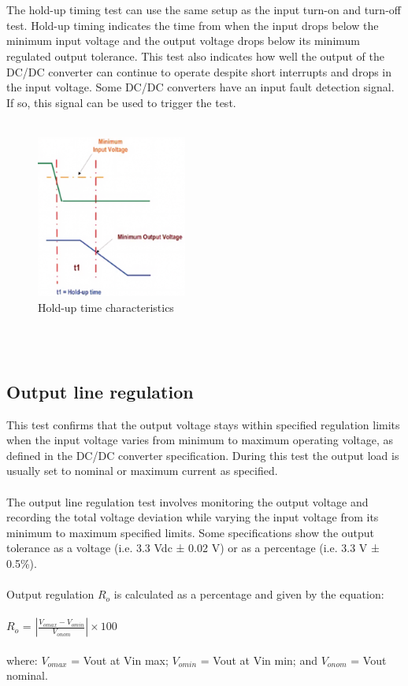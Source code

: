 \\ \\	
The hold-up timing test can use the same setup as the input turn-on and turn-off test. Hold-up timing indicates the time from when the input drops below the minimum input voltage and the output voltage drops below its minimum regulated output tolerance. This test also indicates how well the output of the DC/DC converter can continue to operate despite short interrupts and drops in the input voltage. Some DC/DC converters have an input fault detection signal. If so, this signal can be used to trigger the test.
\\ \\
\begin{figure}[h]
	\centering
	\includegraphics[width=140pt]{IMGS/HoldUpTimeTest.jpg}
	\caption{Hold-up time characteristics}
	\label{fig:arch}
\end{figure} 
\\ \\
\subsection{Output line regulation}

This test confirms that the output voltage stays within specified regulation limits when the input voltage varies from minimum to maximum operating voltage, as defined in the DC/DC converter specification. During this test the output load is usually set to nominal or maximum current as specified.
\\ \\
The output line regulation test involves monitoring the output voltage and recording the total voltage deviation while varying the input voltage from its minimum to maximum specified limits. Some specifications show the output tolerance as a voltage (i.e. 3.3 Vdc ± 0.02 V) or as a percentage (i.e. 3.3 V ± 0.5\%).
\\ \\
Output regulation $R_{o}$ is calculated as a percentage and given by the equation:
\\ \\
\hspace*{5cm}$R_{o}$ = $\left | \frac{V_{omax}-V_{omin}}{V_{onom}} \right | \times 100$
\\ \\
where:
$V_{omax}$ = Vout at Vin max; 
$V_{omin}$ = Vout at Vin min; and
$V_{onom}$ = Vout nominal.
\\ \\
